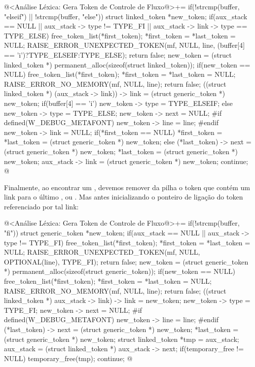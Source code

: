 \iniciocodigo
@<Análise Léxica: Gera Token de Controle de Fluxo@>+=
if(!strcmp(buffer, "elseif") || !strcmp(buffer, "else")){
  struct linked_token *new_token;
  if(aux_stack == NULL || aux_stack -> type != TYPE_FI ||
     aux_stack -> link -> type == TYPE_ELSE){
    free_token_list(*first_token);
    *first_token = *last_token = NULL;
    RAISE_ERROR_UNEXPECTED_TOKEN(mf, NULL, line,
                                (buffer[4] == 'i')?TYPE_ELSEIF:TYPE_ELSE);
    return false;
  }
  new_token = (struct linked_token *)
                permanent_alloc(sizeof(struct linked_token));
  if(new_token == NULL){
    free_token_list(*first_token);
    *first_token = *last_token = NULL;
    RAISE_ERROR_NO_MEMORY(mf, NULL, line);
    return false;
  }
  ((struct linked_token *) (aux_stack -> link)) -> link =
                                            (struct generic_token *) new_token;
  if(buffer[4] == 'i')
    new_token -> type = TYPE_ELSEIF;
  else
    new_token -> type = TYPE_ELSE;
  new_token -> next = NULL;
#if defined(W_DEBUG_METAFONT)
  new_token -> line = line;
#endif
  new_token -> link = NULL;
  if(*first_token == NULL)
    *first_token = *last_token = (struct generic_token *) new_token;
  else{
    (*last_token) -> next = (struct generic_token *) new_token;
    *last_token = (struct generic_token *) new_token;
  }
  aux_stack -> link = (struct generic_token *) new_token;
  continue;
}
@
\fimcodigo

Finalmente, ao encontrar um , devemos remover da pilha
o token  que contém um link para o
último ,  ou . Mas
antes inicializando o ponteiro de ligação do token referenciado por
tal link:

\iniciocodigo
@<Análise Léxica: Gera Token de Controle de Fluxo@>+=
if(!strcmp(buffer, "fi")){
  struct generic_token *new_token;
  if(aux_stack == NULL || aux_stack -> type != TYPE_FI){
    free_token_list(*first_token);
    *first_token = *last_token = NULL;
    RAISE_ERROR_UNEXPECTED_TOKEN(mf, NULL, OPTIONAL(line), TYPE_FI);
    return false;
  }
  new_token = (struct generic_token *)
                permanent_alloc(sizeof(struct generic_token));
  if(new_token == NULL){
    free_token_list(*first_token);
    *first_token = *last_token = NULL;
    RAISE_ERROR_NO_MEMORY(mf, NULL, line);
    return false;
  }
  ((struct linked_token *) aux_stack -> link) -> link = new_token;
  new_token -> type = TYPE_FI;
  new_token -> next = NULL;
#if defined(W_DEBUG_METAFONT)
  new_token -> line = line;
#endif
  (*last_token) -> next = (struct generic_token *) new_token;
  *last_token = (struct generic_token *) new_token;
  struct linked_token *tmp = aux_stack;
  aux_stack = (struct linked_token *) aux_stack -> next;
  if(temporary_free != NULL)
    temporary_free(tmp);
  continue;
}
@
\fimcodigo

